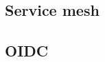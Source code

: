 \documentclass[thesis=M,czech]{FITthesis}[2019/12/23]
\theoremstyle{plain}
\theoremstyle{definition}
\begin{document}
\subsection{Service mesh}


\subsection{OIDC}




\begin{conclusion}
\end{conclusion}




\end{document}
